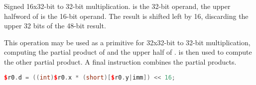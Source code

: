 \noindent Signed 16x32-bit to 32-bit multiplication.  is the 32-bit operand, the
upper halfword of \code{[$r0.y|imm]} is the 16-bit operand. The result is shifted left
by 16, discarding the upper 32 bits of the 48-bit result.

This operation may be used as a primitive for 32x32-bit to 32-bit
multiplication, computing the partial product of  and the upper half
of \code{[$r0.y|imm]}.  is then used to compute the other partial product. A
final  instruction combines the partial products.

\begin{lstlisting}[numbers=none, basicstyle=\ttfamily\footnotesize, language=C++]
$r0.d = ((int)$r0.x * (short)[$r0.y|imm]) << 16;
\end{lstlisting}

